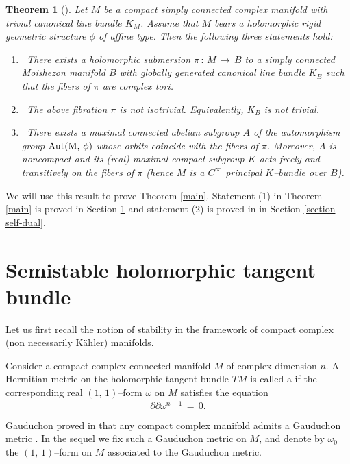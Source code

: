 \documentclass[12pt,reqno]{amsart}
\newtheorem{theorem}{Theorem}[section]
\theoremstyle{definition}
\numberwithin{equation}{section}
\begin{document}
\begin{theorem}[\cite{BCDG}]
\label{main lemma}
Let $M$ be a compact simply connected complex manifold with trivial canonical line bundle $K_M$. Assume that
$M$ bears a holomorphic rigid geometric structure $\phi$ of affine type. Then the following three
statements hold:
\begin{enumerate}
\item[(i)]\, There exists a holomorphic submersion $\pi \,:\, M\,\longrightarrow\, B$ to a simply connected 
Moishezon manifold $B$ with globally generated canonical line bundle $K_B$ such that the fibers of $\pi$ are 
complex tori.

\item[(ii)]\, The above fibration $\pi$ is not isotrivial. Equivalently, $K_B$ is not trivial.

\item[(iii)]\, There exists a maximal connected abelian subgroup $A$ of the automorphism group 
$\rm{Aut}(M,\, \phi)$ whose orbits coincide with the fibers of $\pi$. Moreover, $A$ is noncompact and its 
(real) maximal compact subgroup $K$ acts freely and transitively on the fibers of $\pi$ (hence $M$ is a 
$C^\infty$ principal $K$--bundle over $B$).
\end{enumerate}
\end{theorem}

We will use this result to prove Theorem \ref{main}. Statement (1) in Theorem \ref{main} is proved in 
Section \ref{section semi-stable} and statement (2) is proved in in Section \ref{section self-dual}.

\section{Semistable holomorphic tangent bundle}\label{section semi-stable}

Let us first recall the notion of stability in the framework of compact complex (non necessarily K\"ahler) 
manifolds.

Consider a compact complex connected manifold $M$ of complex dimension $n$. A Hermitian metric on the 
holomorphic tangent bundle $TM$ is called a  if the corresponding real $(1,\, 
1)$--form $\omega$ on $M$ satisfies the equation
$$
\partial\overline{\partial}\omega^{n-1}\,=\, 0.
$$

Gauduchon proved in \cite{Ga} that any compact complex manifold admits a Gauduchon metric \cite{Ga}. In the 
sequel we fix such a Gauduchon metric on $M$, and denote by $\omega_0$ the $(1, \,1)$--form on 
$M$ associated to the Gauduchon metric.
\end{document}
